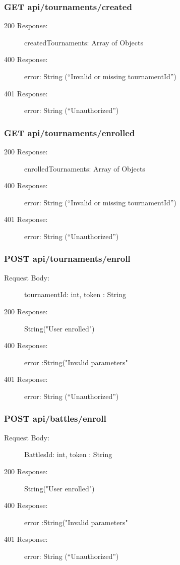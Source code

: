 \documentclass{Configuration_Files/Template}
\begin{document}
\subsubsection{GET api/tournaments/created}
\begin{description}
    \item[200 Response:] createdTournaments: Array of Objects
    \item[400 Response:] error: String (“Invalid or missing tournamentId”)
    \item[401 Response:] error: String (“Unauthorized”)
\end{description}


\subsubsection{GET api/tournaments/enrolled}
\begin{description}
    \item[200 Response:] enrolledTournaments: Array of Objects
    \item[400 Response:] error: String (“Invalid or missing tournamentId”)
    \item[401 Response:] error: String (“Unauthorized”)
\end{description}

\subsubsection{POST api/tournaments/enroll}
\begin{description}
    \item[Request Body:] tournamentId: int, token : String
    \item[200 Response:] String("User enrolled")
    \item[400 Response:] error :String("Invalid parameters"
    \item[401 Response:] error: String (“Unauthorized”)
\end{description}

\subsubsection{POST api/battles/enroll}
\begin{description}
    \item[Request Body:] BattlesId: int, token : String
    \item[200 Response:] String("User enrolled")
    \item[400 Response:] error :String("Invalid parameters"
    \item[401 Response:] error: String (“Unauthorized”)
\end{description}
\end{document}

